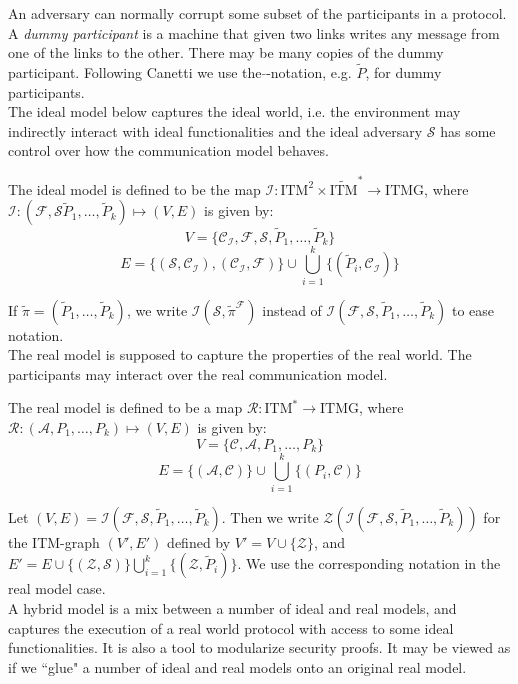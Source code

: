 \documentclass{acm_proc_article-sp}
\begin{document}
An adversary can normally corrupt some subset of the participants in a protocol. A
\textit{dummy participant} is a machine that given two links writes any message from
one of the links to the other. There may be many copies of the dummy participant.
Following Canetti we use the $\tilde{}$-notation, e.g. $\tilde{P}$, for dummy participants.
\\
The ideal model below captures the ideal world, i.e. the environment
may indirectly interact with ideal functionalities and the ideal adversary $\mathcal{S}$
has some control over how the communication model behaves.

\begin{definition}
The ideal model is defined to be the map $\mathcal{I}:\textrm{ITM}^2 \times
\tilde{\textrm{ITM}}^* \to \textrm{ITMG}$, where $\mathcal{I}: (\mathcal{F}, \mathcal{S}
\tilde{P}_1, \ldots, \tilde{P}_k) \mapsto (V, E)$ is given by:
$$V = \{\mathcal{C_I}, \mathcal{F}, \mathcal{S}, \tilde{P}_1, \ldots, \tilde{P}_k\}$$
$$E = \{(\mathcal{S}, \mathcal{C_I}), (\mathcal{C_I}, \mathcal{F})\} \cup
\bigcup_{i = 1}^{k}\{(\tilde{P}_i, \mathcal{C_I})\}$$
\end{definition}

If $\tilde{\pi} = (\tilde{P}_1, \ldots, \tilde{P}_k)$, we write
$\mathcal{I}(\mathcal{S}, \tilde{\pi}^\mathcal{F})$ instead of $\mathcal{I}(\mathcal{F},
\mathcal{S}, \tilde{P}_1, \ldots, \tilde{P}_k)$ to ease notation.\\
The real model is supposed to capture the properties of the real world. The participants
may interact over the real communication model.\\

\begin{definition}
The real model is defined to be a map $\mathcal{R}:\textrm{ITM}^* \to \textrm{ITMG}$,
where $\mathcal{R}:(\mathcal{A}, P_1, \ldots, P_k) \mapsto (V, E)$ is given by:
$$V = \{\mathcal{C}, \mathcal{A}, P_1, \ldots, P_k\}$$
$$E = \{(\mathcal{A}, \mathcal{C})\}\cup\bigcup_{i=1}^k\{(P_i, \mathcal{C})\}$$
\end{definition}

Let $(V, E) = \mathcal{I}(\mathcal{F}, \mathcal{S}, \tilde{P}_1, \ldots, \tilde{P}_k)$.
Then we write $\mathcal{Z}(\mathcal{I}(\mathcal{F}, \mathcal{S}, \tilde{P}_1, \ldots,
\tilde{P}_k))$ for the ITM-graph $(V', E')$ defined by $V' = V \cup \{\mathcal{Z}\}$,
and $E' = E \cup \{(\mathcal{Z}, \mathcal{S})\} \bigcup_{i=1}^k \{(\mathcal{Z}, \tilde{P}_i)\}$.
We use the corresponding notation in the real model case.\\
A hybrid model is a mix between a number of ideal and real models, and captures the execution
of a real world protocol with access to some ideal functionalities. It is also a tool to
modularize security proofs. It may be viewed as if we ``glue" a number of ideal and real
models onto an original real model.
\end{document}
